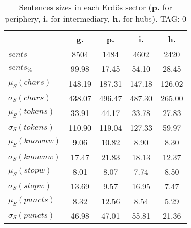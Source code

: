 \begin{table}[h!]
\begin{center}
\begin{tabular}{| l || c | c | c | c |}\hline
 & {\bf g.} & {\bf p.} & {\bf i.} & {\bf h.} \\\hline\hline
$sents$ & 8504  & 1484  & 4602  & 2420 \\
$sents_{\%}$ & 99.98  & 17.45  & 54.10  & 28.45 \\\hline
$\mu_S(chars)$ & 148.19  & 187.31  & 147.18  & 126.02 \\
$\sigma_S(chars)$ & 438.07  & 496.47  & 487.30  & 265.00 \\\hline
$\mu_S(tokens)$ & 33.91  & 44.17  & 33.78  & 27.83 \\
$\sigma_S(tokens)$ & 110.90  & 119.04  & 127.33  & 59.97 \\\hline
$\mu_S(knownw)$ & 9.06  & 10.82  & 8.90  & 8.30 \\
$\sigma_S(knownw)$ & 17.47  & 21.83  & 18.13  & 12.37 \\\hline
$\mu_S(stopw)$ & 8.01  & 8.07  & 7.74  & 8.50 \\
$\sigma_S(stopw)$ & 13.69  & 9.57  & 16.95  & 7.47 \\\hline
$\mu_S(puncts)$ & 8.32  & 12.56  & 8.54  & 5.29 \\
$\sigma_S(puncts)$ & 46.98  & 47.01  & 55.81  & 21.36 \\\hline
\end{tabular}
\caption{Sentences sizes in each Erd\"os sector ({{\bf p.}} for periphery, {{\bf i.}} for intermediary, {{\bf h.}} for hubs). TAG: 0}
\end{center}
\end{table}